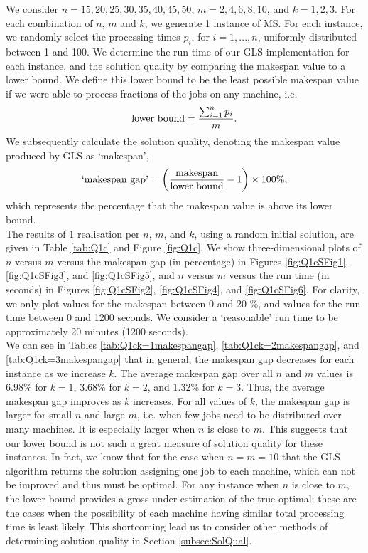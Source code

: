 \documentclass[12pt,a4paper,reqno]{article}
\begin{document}
We consider $n=15, 20, 25, 30, 35, 40, 45, 50$, $m=2,4,6,8,10$, and $k=1,2,3$. For each combination of $n$, $m$ and $k$, we generate 1 instance of MS. For each instance, we randomly select the processing times $p_i$, for $i=1,...,n$, uniformly distributed between 1 and 100. We determine the run time of our GLS implementation for each instance, and the solution quality by comparing the makespan value to a lower bound. We define this lower bound to be the least possible makespan value if we were able to process fractions of the jobs on any machine, i.e.
\begin{equation}
\textnormal{lower bound} = \frac{\sum_{i=1}^n p_i}{m}. \label{eq:NaiveLB}
\end{equation}
We subsequently calculate the solution quality, denoting the makespan value produced by GLS as `makespan',
\begin{equation}
\textnormal{`makespan gap'} = \bigg(\frac{\textnormal{makespan}}{\textnormal{lower bound}} - 1 \bigg) \times 100\%, \label{eq:NaiveMakespanGap}
\end{equation}
which represents the percentage that the makespan value is above its lower bound. \\

The results of 1 realisation per $n$, $m$, and $k$, using a random initial solution, are given in Table \ref{tab:Q1c} and Figure \ref{fig:Q1c}.
We show three-dimensional plots of $n$ versus $m$ versus the makespan gap (in percentage) in Figures \ref{fig:Q1cSFig1}, \ref{fig:Q1cSFig3}, and \ref{fig:Q1cSFig5}, and $n$ versus $m$ versus the run time (in seconds) in Figures \ref{fig:Q1cSFig2}, \ref{fig:Q1cSFig4}, and \ref{fig:Q1cSFig6}. For clarity, we only plot values for the makespan between 0 and 20 \%, and values for the run time between 0 and 1200 seconds. We consider a `reasonable' run time to be approximately 20 minutes (1200 seconds). \\

We can see in Tables \ref{tab:Q1ck=1makespangap}, \ref{tab:Q1ck=2makespangap}, and \ref{tab:Q1ck=3makespangap} that in general, the makespan gap decreases for each instance as we increase $k$. The average makespan gap over all $n$ and $m$ values is 6.98\% for $k=1$, 3.68\% for $k=2$, and 1.32\% for $k=3$. Thus, the average makespan gap improves as $k$ increases. For all values of $k$, the makespan gap is larger for small $n$ and large $m$, i.e. when few jobs need to be distributed over many machines. It is especially larger when $n$ is close to $m$. This suggests that our lower bound is not such a great measure of solution quality for these instances. In fact, we know that for the case when $n=m=10$ that the GLS algorithm returns the solution assigning one job to each machine, which can not be improved and thus must be optimal. For any instance when $n$ is close to $m$, the lower bound provides a gross under-estimation of the true optimal; these are the cases when the possibility of each machine having similar total processing time is least likely. This shortcoming lead us to consider other methods of determining solution quality in Section \ref{subsec:SolQual}. \\
\end{document}
